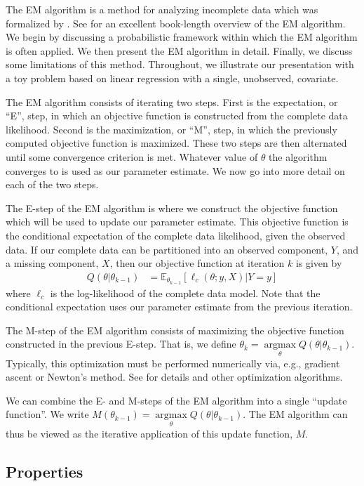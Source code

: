 \documentclass[11pt, oneside]{article}   	%
\newcommand{\bE}{\mathbb{E}}
\DeclareMathOperator*{\argmax}{argmax}
\begin{document}
The EM algorithm is a method for analyzing incomplete data which was formalized by \citet{Dem77}. See \citet{McL08} for an excellent book-length overview of the EM algorithm. We begin by discussing a probabilistic framework within which the EM algorithm is often applied. We then present the EM algorithm in detail. Finally, we discuss some limitations of this method. Throughout, we illustrate our presentation with a toy problem based on linear regression with a single, unobserved, covariate.

The EM algorithm consists of iterating two steps. First is the expectation, or ``E'', step, in which an objective function is constructed from the complete data likelihood. Second is the maximization, or ``M'', step, in which the previously computed objective function is maximized. These two steps are then alternated until some convergence criterion is met. Whatever value of $\theta$ the algorithm converges to is used as our parameter estimate. We now go into more detail on each of the two steps.

The E-step of the EM algorithm is where we construct the objective function which will be used to update our parameter estimate. This objective function is the conditional expectation of the complete data likelihood, given the observed data. If our complete data can be partitioned into an observed component, $Y$, and a missing component, $X$, then our objective function at iteration $k$ is given by
%
\begin{align}
    Q(\theta|\theta_{k-1}) & = \bE_{\theta_{k-1}}[\ell_c(\theta; y, X) | Y=y]
\end{align}
%
where $\ell_c$ is the log-likelihood of the complete data model. Note that the conditional expectation uses our parameter estimate from the previous iteration.

The M-step of the EM algorithm consists of maximizing the objective function constructed in the previous E-step. That is, we define $\theta_k = \argmax\limits_\theta Q(\theta|\theta_{k-1})$. Typically, this optimization must be performed numerically via, e.g., gradient ascent or Newton's method. See \citet{Noc06} for details and other optimization algorithms. 

We can combine the E- and M-steps of the EM algorithm into a single ``update function''. We write $M(\theta_{k-1}) = \argmax\limits_\theta Q(\theta|\theta_{k-1})$. The EM algorithm can thus be viewed as the iterative application of this update function, $M$.

\subsection{Properties}
\end{document}
